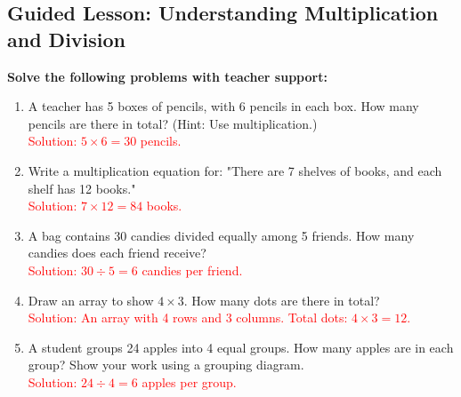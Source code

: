 \documentclass[12pt]{article}
\title{}
\date{}
\begin{document}
\subsection*{Guided Lesson: Understanding Multiplication and Division}
\onehalfspacing

\begin{tcolorbox}[colframe=black!60, colback=white, 
coltitle=black, colbacktitle=black!15, fonttitle=\bfseries\Large, 
title=Guided Practice, halign title=center, left=10pt, right=10pt, top=10pt, bottom=80pt]
\textbf{Solve the following problems with teacher support:}
\begin{enumerate}[itemsep=5em] %
    \item A teacher has 5 boxes of pencils, with 6 pencils in each box. How many pencils are there in total? (Hint: Use multiplication.)
    \\ \textcolor{red}{Solution: $5 \times 6 = 30$ pencils.}
    \item Write a multiplication equation for: "There are 7 shelves of books, and each shelf has 12 books."
    \\ \textcolor{red}{Solution: $7 \times 12 = 84$ books.}
    \item A bag contains 30 candies divided equally among 5 friends. How many candies does each friend receive?
    \\ \textcolor{red}{Solution: $30 \div 5 = 6$ candies per friend.}
    \item Draw an array to show $4 \times 3$. How many dots are there in total?
    \\ \textcolor{red}{Solution: An array with 4 rows and 3 columns. Total dots: $4 \times 3 = 12$.}
    \item A student groups 24 apples into 4 equal groups. How many apples are in each group? Show your work using a grouping diagram.
    \\ \textcolor{red}{Solution: $24 \div 4 = 6$ apples per group.}
\end{enumerate}
\end{tcolorbox}
\end{document}
